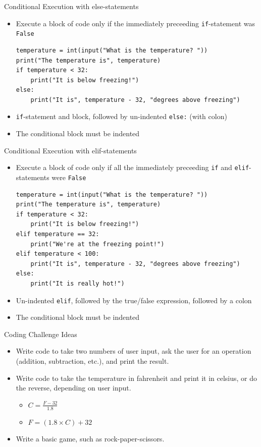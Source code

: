 \begin{frame}[fragile]{Conditional Execution with {\ttfamily else}-statements}
  \begin{itemize}
    \item Execute a block of code only if the immediately preceeding \texttt{if}-statement was \texttt{False}
\begin{lstlisting}
temperature = int(input("What is the temperature? "))
print("The temperature is", temperature)
if temperature < 32:
    print("It is below freezing!")
else:
    print("It is", temperature - 32, "degrees above freezing")
\end{lstlisting}
\item \texttt{if}-statement and block, followed by un-indented \texttt{else:} (with colon)
\item The conditional block must be indented
  \end{itemize}
\end{frame}

\pagebreak

\begin{frame}[fragile]{Conditional Execution with {\ttfamily elif}-statements}
  \begin{itemize}
    \item Execute a block of code only if all the immediately preceeding \texttt{if} and \texttt{elif}-statements were \texttt{False}
\begin{lstlisting}
temperature = int(input("What is the temperature? "))
print("The temperature is", temperature)
if temperature < 32:
    print("It is below freezing!")
elif temperature == 32:
    print("We're at the freezing point!")
elif temperature < 100:
    print("It is", temperature - 32, "degrees above freezing")
else:
    print("It is really hot!")
\end{lstlisting}
\item Un-indented \texttt{elif}, followed by the true/false expression, followed by a colon
\item The conditional block must be indented
  \end{itemize}
\end{frame}

\begin{frame}{Coding Challenge Ideas}
  \begin{itemize}
    \item Write code to take two numbers of user input, ask the user for an operation (addition, subtraction, etc.), and print the result.
    \item Write code to take the temperature in fahrenheit and print it in celsius, or do the reverse, depending on user input.
      \begin{itemize}
        \item $C = \displaystyle\frac{F - 32}{1.8}$
        \item $F = (1.8 \times C) + 32$
      \end{itemize}
    \item Write a basic game, such as rock-paper-scissors.
  \end{itemize}
\end{frame}

